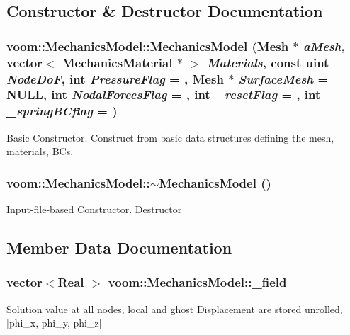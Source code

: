\subsection{Constructor \& Destructor Documentation}
\hypertarget{classvoom_1_1_mechanics_model_a8b24dd67f8e395576c7d90ee9faf373c}{
\subsubsection[{MechanicsModel}]{\setlength{\rightskip}{0pt plus 5cm}voom::MechanicsModel::MechanicsModel ({\bf Mesh} $\ast$ {\em aMesh}, \/  vector$<$ {\bf MechanicsMaterial} $\ast$ $>$ {\em Materials}, \/  const uint {\em NodeDoF}, \/  int {\em PressureFlag} = {}, \/  {\bf Mesh} $\ast$ {\em SurfaceMesh} = {\ttfamily NULL}, \/  int {\em NodalForcesFlag} = {}, \/  int {\em \_\-resetFlag} = {}, \/  int {\em \_\-springBCflag} = {})}}
\label{classvoom_1_1_mechanics_model_a8b24dd67f8e395576c7d90ee9faf373c}


Basic Constructor. Construct from basic data structures defining the mesh, materials, BCs. \hypertarget{classvoom_1_1_mechanics_model_a39cab4fab5f26d8bf83e63a6d91e33f6}{
\subsubsection[{$\sim$MechanicsModel}]{\setlength{\rightskip}{0pt plus 5cm}voom::MechanicsModel::$\sim$MechanicsModel ()}}
\label{classvoom_1_1_mechanics_model_a39cab4fab5f26d8bf83e63a6d91e33f6}


Input-\/file-\/based Constructor. Destructor 

\subsection{Member Data Documentation}
\hypertarget{classvoom_1_1_mechanics_model_a0c96adf9c1e07f5b604a3db9ffe9b750}{
\subsubsection[{\_\-field}]{\setlength{\rightskip}{0pt plus 5cm}vector$<$Real $>$ {\bf voom::MechanicsModel::\_\-field}}}
\label{classvoom_1_1_mechanics_model_a0c96adf9c1e07f5b604a3db9ffe9b750}
Solution value at all nodes, local and ghost Displacement are stored unrolled, \mbox{[}phi\_\-x, phi\_\-y, phi\_\-z\mbox{]} 

